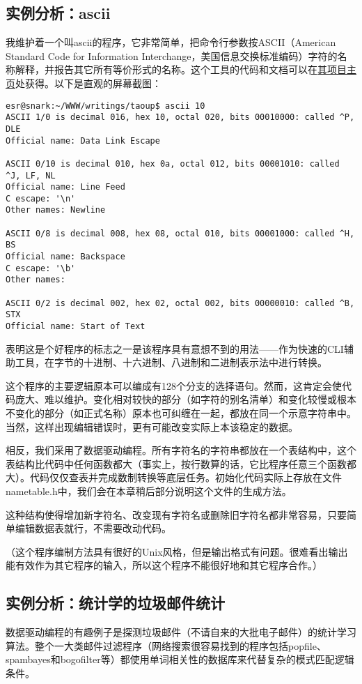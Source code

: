 \documentclass[12pt,oneside]{ctexbook}
\begin{document}
\begin{common-format}
\subsection{实例分析：ascii}
我维护着一个叫ascii的程序，它非常简单，把命令行参数按ASCII（American Standard Code for Information Interchange，美国信息交换标准编码）字符的名称解释，并报告其它所有等价形式的名称。这个工具的代码和文档可以在\href{http://www.catb.org/~esr/ascii}{其项目主页}处获得。以下是直观的屏幕截图：

\begin{Verbatim}
esr@snark:~/WWW/writings/taoup$ ascii 10
ASCII 1/0 is decimal 016, hex 10, octal 020, bits 00010000: called ^P, DLE
Official name: Data Link Escape

ASCII 0/10 is decimal 010, hex 0a, octal 012, bits 00001010: called ^J, LF, NL
Official name: Line Feed
C escape: '\n'
Other names: Newline

ASCII 0/8 is decimal 008, hex 08, octal 010, bits 00001000: called ^H, BS
Official name: Backspace
C escape: '\b'
Other names:

ASCII 0/2 is decimal 002, hex 02, octal 002, bits 00000010: called ^B, STX
Official name: Start of Text
\end{Verbatim}

表明这是个好程序的标志之一是该程序具有意想不到的用法——作为快速的CLI辅助工具，在字节的十进制、十六进制、八进制和二进制表示法中进行转换。

这个程序的主要逻辑原本可以编成有128个分支的选择语句。然而，这肯定会使代码庞大、难以维护。变化相对较快的部分（如字符的别名清单）和变化较慢或根本不变化的部分（如正式名称）原本也可纠缠在一起，都放在同一个示意字符串中。当然，这样出现编辑错误时，更有可能改变实际上本该稳定的数据。

相反，我们采用了数据驱动编程。所有字符名的字符串都放在一个表结构中，这个表结构比代码中任何函数都大（事实上，按行数算的话，它比程序任意三个函数都大）。代码仅仅查表并完成数制转换等底层任务。初始化代码实际上存放在文件nametable.h中，我们会在本章稍后部分说明这个文件的生成方法。

这种结构使得增加新字符名、改变现有字符名或删除旧字符名都非常容易，只要简单编辑数据表就行，不需要改动代码。

（这个程序编制方法具有很好的Unix风格，但是输出格式有问题。很难看出输出能有效作为其它程序的输入，所以这个程序不能很好地和其它程序合作。）

\subsection{实例分析：统计学的垃圾邮件统计}
数据驱动编程的有趣例子是探测垃圾邮件（不请自来的大批电子邮件）的统计学习算法。整个一大类邮件过滤程序（网络搜索很容易找到的程序包括popfile、spambayes和bogofilter等）都使用单词相关性的数据库来代替复杂的模式匹配逻辑条件。


\end{common-format}
\end{document}
